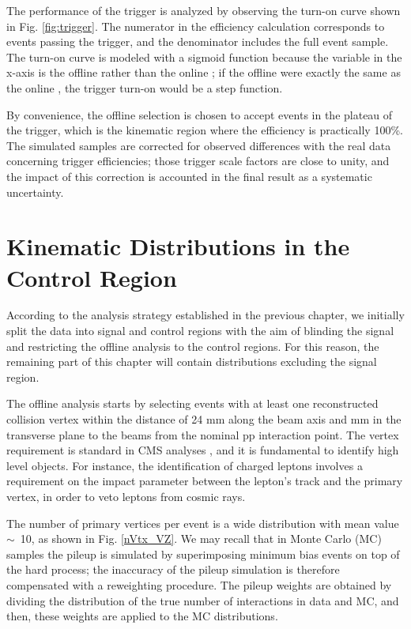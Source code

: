The performance of the trigger is analyzed by observing the turn-on curve shown in Fig. \ref{fig:trigger}. The numerator in the efficiency calculation corresponds to events passing the trigger, and the denominator includes the full event sample. The turn-on curve is modeled with a sigmoid function because the variable in the x-axis is the offline \ptrans rather than the online \ptrans; if the offline \ptrans were exactly the same as the online \ptrans, the trigger turn-on would be a step function. 

By convenience, the offline selection is chosen to accept events in the plateau of the trigger, which is the kinematic region where the efficiency is practically 100\%. The simulated samples are corrected for observed differences with the real data concerning trigger efficiencies; those trigger scale factors are close to unity, and the impact of this correction is accounted in the final result as a systematic uncertainty.

\section{Kinematic Distributions in the Control Region}
According to the analysis strategy established in the previous chapter,  we initially split the data into signal and control regions with the aim of blinding the signal and restricting the offline analysis to the control regions. For this reason, the remaining part of this chapter will contain distributions excluding the signal region.  

The offline analysis starts by selecting events with at least one reconstructed collision vertex within the distance of 24 mm along the beam axis and  mm in the transverse plane to the beams from the nominal pp interaction point. The vertex requirement is standard in CMS analyses \cite{Chatrchyan:2014fea}, and it is fundamental to identify high level objects. For instance, the identification of charged leptons involves a requirement on the impact parameter between the lepton's track and the primary vertex, in order to veto leptons from cosmic rays.

The number of primary vertices per event is a wide distribution with mean value $\sim$~10, as shown in Fig. \ref{nVtx_VZ}. We may recall that in Monte Carlo (MC) samples the pileup is simulated by superimposing minimum bias events on top of the hard process; the inaccuracy of the pileup simulation is therefore compensated with a reweighting procedure. The pileup weights are obtained by dividing the distribution of the true number of interactions in data and MC, and then, these weights are applied to the MC distributions.

